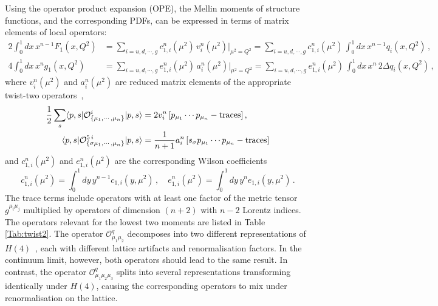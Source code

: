 Using the operator product expansion (OPE), the Mellin moments of structure functions, and the corresponding PDFs, can be expressed in terms of matrix elements of local operators:
\begin{align}
2 \int_0^1 dx\, x^{n-1} F_1(x,Q^2) &= \sum_{i=u,d, \cdots, g} c_{1,i}^n(\mu^2)\, v_i^n(\mu^2)|_{\mu^2=Q^2} = \sum_{i=u,d, \cdots, g} c_{1,i}^n(\mu^2)\, \int_0^1 dx\, x^{n-1} q_i(x,Q^2)\,,\\
4 \int_0^1 dx\, x^n g_1(x,Q^2) &= \sum_{i=u,d, \cdots, g} e_{1,i}^n(\mu^2)\, a_i^n(\mu^2)|_{\mu^2=Q^2} = \sum_{i=u,d, \cdots, g} e_{1,i}^n(\mu^2)\, \int_0^1 dx\, x^n\, 2 \Delta q_i(x,Q^2) \,,
\end{align}
where $v_i^n(\mu^2)$ and $a_i^n(\mu^2)$ are reduced matrix elements of the appropriate twist-two operators~\cite{Gockeler:1995wg},
\begin{align}
\frac{1}{2} \sum_s \langle p,s|\mathcal{O}^i_{\{\mu_1,\cdots,\mu_n\}}|p,s\rangle = {} & 2 v_i^n\, [p_{\mu_1}\cdots p_{\mu_n} - {\rm traces}] \,, \label{eq:twist2me}\\
\langle p,s|\mathcal{O}^{5\,i}_{\{\sigma \mu_1,\cdots,\mu_n\}}|p,s\rangle = {} & \frac{1}{n+1} a_i^n\, [s_\sigma p_{\mu_1}\cdots p_{\mu_n} - {\rm traces}] \\
\end{align}
and $c_{1,i}^n(\mu^2)$ and $e_{1,i}^n(\mu^2)$ are the corresponding Wilson coefficients
\begin{equation}
c_{1,i}^n(\mu^2) = \int_0^1 dy\, y^{n-1} c_{1,i}(y,\mu^2)\,, \quad
e_{1,i}^n(\mu^2) = \int_0^1 dy\, y^n e_{1,i}(y,\mu^2)\,.
\end{equation}
The trace terms include operators with at least one factor of the metric tensor $g^{\mu_i \mu_j}$ multiplied by
operators of dimension $(n+2)$ with $n-2$ Lorentz indices. The operators relevant for the lowest two moments are listed in Table \ref{Tab:twist2}. The operator $\mathcal{O}^q_{\mu_1\mu_2}$ decomposes into two different representations of $H(4)$~\cite{Gockeler:1996mu}, each with different lattice artifacts and renormalisation factors. In the continuum limit, however, both operators should lead to the same result. In contrast, the operator $\mathcal{O}^q_{\mu_1\mu_2\mu_3}$ splits into several representations transforming identically under $H(4)$, causing the corresponding operators to mix under renormalisation on the lattice.
